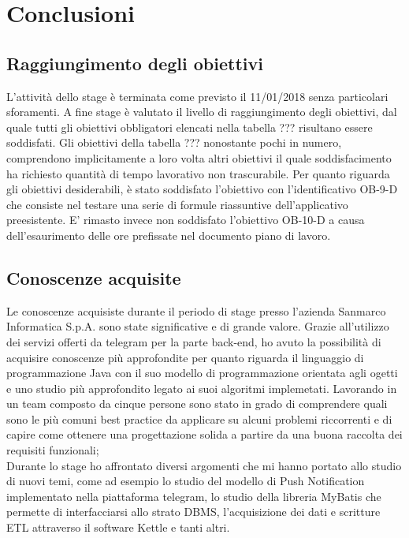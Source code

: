 
\chapter{Conclusioni}
\label{cap:conclusioni}


\section{Raggiungimento degli obiettivi}
L'attività dello stage è terminata come previsto il 11/01/2018 senza particolari sforamenti. 
A fine stage è valutato il livello di raggiungimento degli obiettivi, dal quale tutti gli obiettivi obbligatori elencati nella tabella
 ???  risultano essere soddisfati. Gli obiettivi della tabella ??? nonostante pochi in numero, comprendono implicitamente a loro volta altri obiettivi il quale soddisfacimento ha richiesto quantità di tempo lavorativo non trascurabile. Per quanto riguarda gli obiettivi desiderabili, è stato soddisfato l'obiettivo con l'identificativo OB-9-D che consiste nel testare una serie di formule riassuntive dell'applicativo preesistente. E' rimasto invece non soddisfato l'obiettivo OB-10-D a causa dell'esaurimento delle ore prefissate nel documento piano di lavoro.

\section{Conoscenze acquisite}
Le conoscenze acquisiste durante il periodo di stage presso l'azienda Sanmarco Informatica S.p.A. sono state significative e di grande valore. Grazie all'utilizzo dei servizi offerti da telegram per la parte back-end, ho avuto la possibilità di acquisire conoscenze più approfondite per quanto riguarda il linguaggio di programmazione Java con il suo modello di programmazione orientata agli ogetti e uno studio più approfondito legato ai suoi algoritmi implemetati. Lavorando in un team composto da cinque persone sono stato in grado di comprendere quali sono le più comuni best practice da applicare su alcuni problemi riccorrenti e di capire  come ottenere una progettazione solida a partire da una buona raccolta dei requisiti funzionali; \\ Durante lo stage ho affrontato diversi argomenti che mi hanno portato allo studio di nuovi temi, come ad esempio lo studio del modello di Push Notification implementato nella piattaforma telegram, lo studio della libreria MyBatis che permette di interfacciarsi allo strato DBMS, l'acquisizione dei dati e scritture ETL attraverso il software Kettle e tanti altri. 

